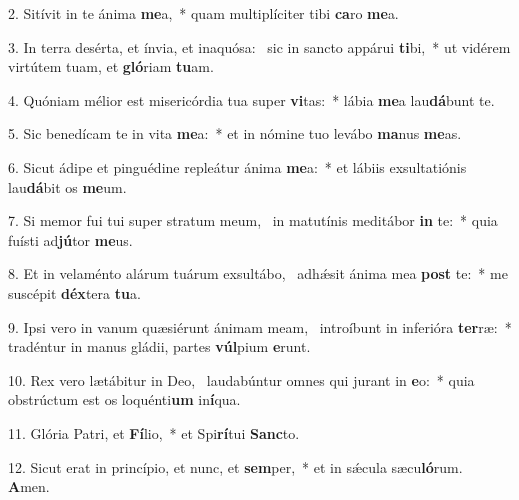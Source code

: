 2. Sitívit in te ánima \textbf{me}a,~*  quam multiplíciter tibi \textbf{ca}ro \textbf{me}a.\

3. In terra desérta, et ínvia, et inaquósa: \dag\  sic in sancto appárui \textbf{ti}bi,~*  ut vidérem virtútem tuam, et \textbf{gló}riam \textbf{tu}am.\

4. Quóniam mélior est misericórdia tua super \textbf{vi}tas:~*  lábia \textbf{me}a lau\textbf{dá}bunt te.\

5. Sic benedícam te in vita \textbf{me}a:~*  et in nómine tuo levábo \textbf{ma}nus \textbf{me}as.\

6. Sicut ádipe et pinguédine repleátur ánima \textbf{me}a:~*  et lábiis exsultatiónis lau\textbf{dá}bit os \textbf{me}um.\

7. Si memor fui tui super stratum meum, \dag\  in matutínis meditábor \textbf{in} te:~*  quia fuísti ad\textbf{jú}tor \textbf{me}us.\

8. Et in velaménto alárum tuárum exsultábo, \dag\  adhǽsit ánima mea \textbf{post} te:~*  me suscépit \textbf{déx}tera \textbf{tu}a.\

9. Ipsi vero in vanum quæsiérunt ánimam meam, \dag\  introíbunt in inferióra \textbf{ter}ræ:~*  tradéntur in manus gládii, partes \textbf{vúl}pium \textbf{e}runt.\

10. Rex vero lætábitur in Deo, \dag\  laudabúntur omnes qui jurant in \textbf{e}o:~*  quia obstrúctum est os loquénti\textbf{um} in\textbf{í}qua.\

11. Glória Patri, et \textbf{Fí}lio,~*  et Spi\textbf{rí}tui \textbf{Sanc}to.\

12. Sicut erat in princípio, et nunc, et \textbf{sem}per,~*  et in sǽcula sæcu\textbf{ló}rum. \textbf{A}men.\

